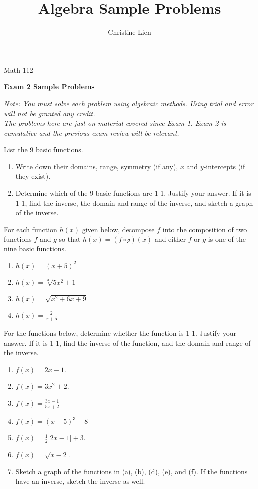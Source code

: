 \documentclass{ximera}
\title{Algebra Sample Problems}
\author{Christine Lien}
\begin{document}
\hfill Math 112 

{\large\bf Exam 2 Sample Problems} 

\textit{Note: You must solve each problem using algebraic methods. Using trial and error will not be granted any credit.
\\
The problems here are just on material covered since Exam 1. Exam 2 is cumulative and the previous exam review will be relevant.}

\begin{exercise}
List the 9 basic functions. 
\begin{enumerate}
\item Write down their domains, range, symmetry (if any), $x$ and $y$-intercepts (if they exist). \item Determine which of the 9 basic functions are 1-1. Justify your answer. If it is 1-1, find the inverse, the domain and range of the inverse, and sketch a graph of the inverse.  
\end{enumerate}
\end{exercise}

\begin{exercise}
For each function $h(x)$ given below, decompose $f$ into the composition of two functions $f$ and $g$ so that $h(x)=(f\circ g)(x)$ and either $f$ or $g$ is one of the nine basic functions.
\begin{enumerate}
\item $h(x)=(x+5)^2$
\item $h(x)=\sqrt[3]{5x^2+1}$
\item $h(x)=\sqrt{x^2+6x+9}$
\item $\displaystyle h(x)= \frac{2}{x+5}$
\end{enumerate}
\end{exercise}

\begin{exercise}
For the functions below, determine whether the function is 1-1. Justify your answer. If it is 1-1, find the inverse of the function, and the domain and range of the inverse. 

\begin{enumerate}
\item $f(x)=2x-1$.
\item $f(x)=3x^{2}+2$.
\item $\displaystyle f(x)=\frac{3x-1}{5x+2}$
\item $f(x)=(x-5)^{3}-8$
\item $\displaystyle f(x)=\frac{1}{2}|2x-1|+3$.
\item $f(x)=\sqrt{x-2}$.
\item Sketch a graph of the functions in (a), (b), (d), (e), and (f). If the functions have an inverse, sketch the inverse as well. 
\end{enumerate}

\end{exercise}
\end{document}
